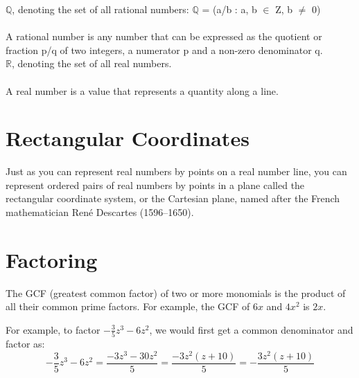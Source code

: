 \documentclass[12pt, letterpaper]{article}
\begin{document}
\noindent$\mathbb{Q}$, denoting the set of all rational numbers: $\mathbb{Q}$ =
(a/b : a, b $\in$ Z, b $\neq$ 0)
\\\\
A rational number is any number that can be expressed as the quotient or
fraction p/q of two integers, a numerator p and a non-zero denominator q.
\\

\noindent$\mathbb{R}$, denoting the set of all real numbers.
\\\\
A real number is a value that represents a quantity along a line.
\\

\section{Rectangular Coordinates}

Just as you can represent real numbers by points on a real number line, you can
represent ordered pairs of real numbers by points in a plane called the
rectangular coordinate system, or the Cartesian plane, named after the French
mathematician René Descartes (1596–1650).
\\

\section{Factoring}

The GCF (greatest common factor) of two or more monomials is the product of all 
their common prime factors. For example, the GCF of $6x$ and $4x^2$ is $2x$.

For example, to factor $-\frac{3}{5}z^3 - 6z^2$, we would first get a common
denominator and factor as: 
\[ -\frac{3}{5}z^3 - 6z^2 = \frac{-3z^3 - 30z^2}{5} =
\frac{-3z^2(z + 10)}{5} = -\frac{3z^2(z + 10)}{5}\]

\end{document}
